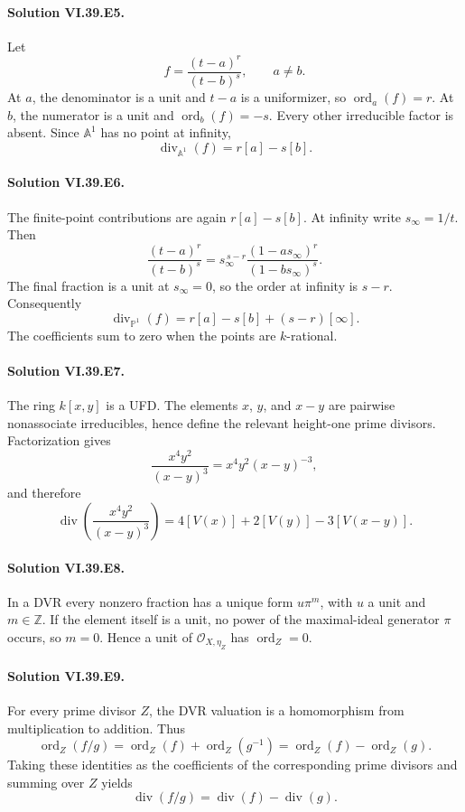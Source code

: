 \paragraph{Solution VI.39.E5.}\label{sol:vi39-e05}
Let
\[
 f=\frac{(t-a)^r}{(t-b)^s},\qquad a\ne b.
\]
At \(a\), the denominator is a unit and \(t-a\) is a uniformizer, so \(\operatorname{ord}_a(f)=r\).  At \(b\), the numerator is a unit and \(\operatorname{ord}_b(f)=-s\).  Every other irreducible factor is absent.  Since \(\mathbb A^1\) has no point at infinity,
\[
 \operatorname{div}_{\mathbb A^1}(f)=r[a]-s[b].
\]

\paragraph{Solution VI.39.E6.}\label{sol:vi39-e06}
The finite-point contributions are again \(r[a]-s[b]\).  At infinity write \(s_\infty=1/t\).  Then
\[
 \frac{(t-a)^r}{(t-b)^s}
 =s_\infty^{\,s-r}
   \frac{(1-a s_\infty)^r}{(1-b s_\infty)^s}.
\]
The final fraction is a unit at \(s_\infty=0\), so the order at infinity is \(s-r\).  Consequently
\[
 \operatorname{div}_{\mathbb P^1}(f)
 =r[a]-s[b]+(s-r)[\infty].
\]
The coefficients sum to zero when the points are \(k\)-rational.

\paragraph{Solution VI.39.E7.}\label{sol:vi39-e07}
The ring \(k[x,y]\) is a UFD.  The elements \(x\), \(y\), and \(x-y\) are pairwise nonassociate irreducibles, hence define the relevant height-one prime divisors.  Factorization gives
\[
 \frac{x^4y^2}{(x-y)^3}=x^4y^2(x-y)^{-3},
\]
and therefore
\[
 \operatorname{div}\!\left(\frac{x^4y^2}{(x-y)^3}\right)
 =4[V(x)]+2[V(y)]-3[V(x-y)].
\]

\paragraph{Solution VI.39.E8.}\label{sol:vi39-e08}
In a DVR every nonzero fraction has a unique form \(u\pi^m\), with \(u\) a unit and \(m\in\mathbb Z\).  If the element itself is a unit, no power of the maximal-ideal generator \(\pi\) occurs, so \(m=0\).  Hence a unit of \(\mathcal O_{X,\eta_Z}\) has \(\operatorname{ord}_Z=0\).

\paragraph{Solution VI.39.E9.}\label{sol:vi39-e09}
For every prime divisor \(Z\), the DVR valuation is a homomorphism from multiplication to addition.  Thus
\[
 \operatorname{ord}_Z(f/g)
 =\operatorname{ord}_Z(f)+\operatorname{ord}_Z(g^{-1})
 =\operatorname{ord}_Z(f)-\operatorname{ord}_Z(g).
\]
Taking these identities as the coefficients of the corresponding prime divisors and summing over \(Z\) yields
\[
 \operatorname{div}(f/g)=\operatorname{div}(f)-\operatorname{div}(g).
\]

